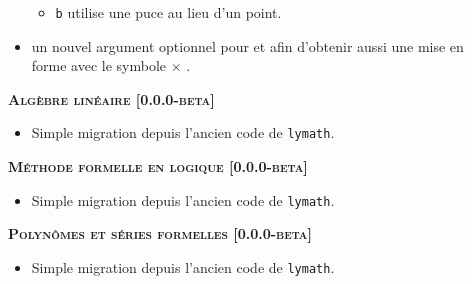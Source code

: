 \documentclass[12pt,a4paper]{book}
\begin{document}
\begin{description}
\begin{itemize}[itemsep=.5em]
\begin{itemize}[itemsep=.5em]
        \item \verb+b+ utilise une puce au lieu d'un point.
    \end{itemize}


	


    \item {}
          un nouvel argument optionnel pour  et  afin d'obtenir aussi une mise en forme avec le symbole $\times$ .


    
\end{itemize}


\separation




\begin{center}
    \textbf{\textsc{Algèbre linéaire [0.0.0-beta]}}
\end{center}

\begin{itemize}[itemsep=.5em]
    \item Simple migration depuis l'ancien code de \verb+lymath+.
\end{itemize}


\separation




\begin{center}
    \textbf{\textsc{Méthode formelle en logique [0.0.0-beta]}}
\end{center}

\begin{itemize}[itemsep=.5em]
    \item Simple migration depuis l'ancien code de \verb+lymath+.
\end{itemize}


\separation




\begin{center}
    \textbf{\textsc{Polynômes et séries formelles [0.0.0-beta]}}
\end{center}

\begin{itemize}[itemsep=.5em]
    \item Simple migration depuis l'ancien code de \verb+lymath+.
\end{itemize}


\separation



\end{description}
\end{document}
